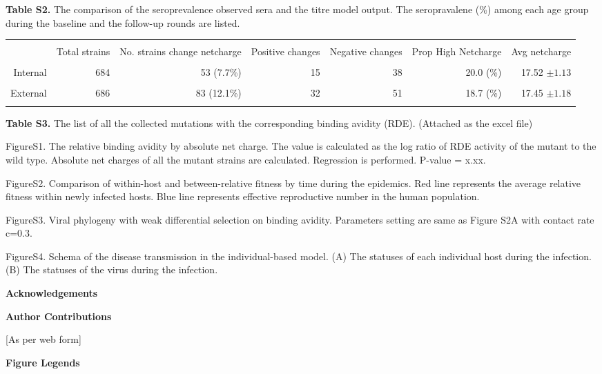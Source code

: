 \documentclass[12pt,a4paper]{article}
\begin{document}
\clearpage


\begin{table}
{\bf Table S2.} The comparison of the seroprevalence observed sera and the titre model output. The seropravalene (\%) among each age group during the baseline and the follow-up rounds are listed.

\begin{tabular*}{16cm}{rrrrrrr}

\hline\hline \\%

   & Total strains&  \parbox[c]{1.8 cm}{\raggedright No. strains change netcharge}  &    \parbox[c]{1.8cm}{\raggedright Positive changes} &   \parbox[c]{1.8cm}{\raggedright Negative changes} &     \parbox[c]{1.8cm}{\raggedright Prop High Netcharge}    &     \parbox[c]{1.8cm}{\raggedright Avg netcharge}   \\
\hline \\ %

Internal &  684 & 53 (7.7\%) &  15 &   38 & 20.0 (\%) & 17.52 $\pm 1.13$\\ \\

External &  686 & 83 (12.1\%) &  32 &   51 & 18.7 (\%)& 17.45 $\pm 1.18$\\ \\


\hline %
\end{tabular*}
\end{table}

\clearpage


{\bf Table S3.} The list of all the collected mutations with the corresponding binding avidity (RDE). (Attached as the excel file)


\clearpage


FigureS1. The relative binding avidity by absolute net charge. The value is calculated as the log ratio of RDE activity of the mutant to the wild type. Absolute net charges of all the mutant strains are calculated. Regression is performed. P-value = x.xx. 

FigureS2. Comparison of within-host and between-relative fitness by time during the epidemics.
Red line represents the average relative fitness within newly infected hosts. Blue line represents effective reproductive number in the human population.

FigureS3. Viral phylogeny with weak differential selection on binding avidity. Parameters setting are same as Figure S2A with contact rate c=0.3. 

FigureS4. Schema of the disease transmission in the individual-based model. (A) The statuses of each individual host during the infection. (B) The statuses of the virus during the infection.


\clearpage

{\bf Acknowledgements}


{\bf Author Contributions}

[As per web form]

{\bf Figure Legends}

\clearpage
\end{document}

